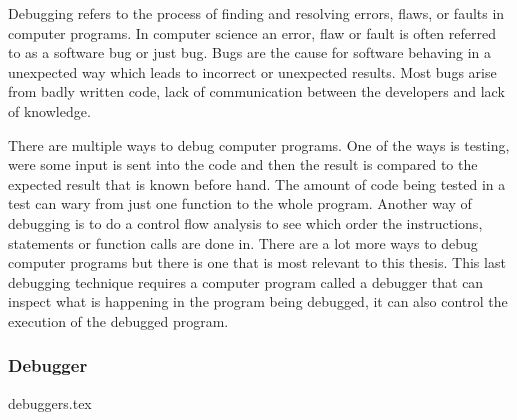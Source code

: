  

Debugging refers to the process of finding and resolving errors, flaws, or faults in computer programs.
In computer science an error, flaw or fault is often referred to as a software bug or just bug.
Bugs are the cause for software behaving in a unexpected way which leads to incorrect or unexpected results.
Most bugs arise from badly written code, lack of communication between the developers and lack of knowledge.


There are multiple ways to debug computer programs.
One of the ways is testing, were some input is sent into the code and then the result is compared to the expected result that is known before hand.
The amount of code being tested in a test can wary from just one function to the whole program.
Another way of debugging is to do a control flow analysis to see which order the instructions, statements or function calls are done in.
There are a lot more ways to debug computer programs but there is one that is most relevant to this thesis.
This last debugging technique requires a computer program called a debugger that can inspect what is happening in the program being debugged, it can also control the execution of the debugged program.



\subsubsection{Debugger}
{debuggers.tex}

